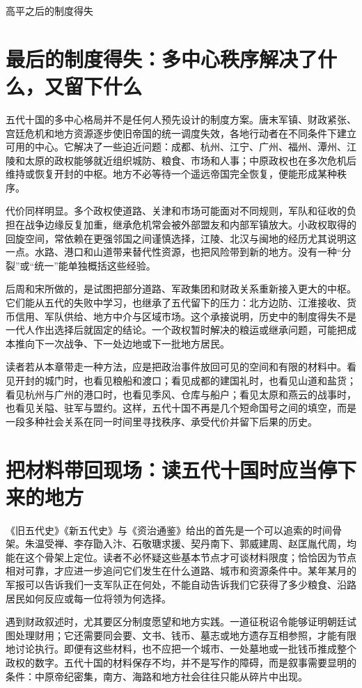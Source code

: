\begin{causalchain}{高平之后的制度得失}
\section{最后的制度得失：多中心秩序解决了什么，又留下什么}

五代十国的多中心格局并不是任何人预先设计的制度方案。唐末军镇、财政紧张、宫廷危机和地方资源逐步使旧帝国的统一调度失效，各地行动者在不同条件下建立可用的中心。它解决了一些迫近问题：成都、杭州、江宁、广州、福州、潭州、江陵和太原的政权能够就近组织城防、粮食、市场和人事；中原政权也在多次危机后维持或恢复开封的中枢。地方不必等待一个遥远帝国完全恢复，便能形成某种秩序。

代价同样明显。多个政权使道路、关津和市场可能面对不同规则，军队和征收的负担在战争边缘反复加重，继承危机常会被外部盟友和内部军镇放大。小政权取得的回旋空间，常依赖在更强邻国之间谨慎选择，江陵、北汉与闽地的经历尤其说明这一点。水路、港口和山道带来替代性资源，也把风险带到新的地方。没有一种“分裂”或“统一”能单独概括这些经验。

后周和宋所做的，是试图把部分道路、军政集团和财政关系重新接入更大的中枢。它们能从五代的失败中学习，也继承了五代留下的压力：北方边防、江淮接收、货币信用、军队供给、地方中介与区域市场。这个承接说明，历史中的制度得失不是一代人作出选择后就固定的结论。一个政权暂时解决的粮运或继承问题，可能把成本推向下一次战争、下一处边地或下一批地方居民。

读者若从本章带走一种方法，应是把政治事件放回可见的空间和有限的材料中。看见开封的城门时，也看见粮船和渡口；看见成都的建国礼时，也看见山道和盐货；看见杭州与广州的港口时，也看见季风、仓库与船户；看见太原和燕云的战事时，也看见关隘、驻军与盟约。这样，五代十国不再是几个短命国号之间的填空，而是一段多种社会关系在同一时间里寻找秩序、承受代价并留下后果的历史。

\section{把材料带回现场：读五代十国时应当停下来的地方}

《旧五代史》《新五代史》与《资治通鉴》给出的首先是一个可以追索的时间骨架。朱温受禅、李存勖入汴、石敬瑭求援、契丹南下、郭威建周、赵匡胤代周，均能在这个骨架上定位。读者不必怀疑这些基本节点才可谈材料限度；恰恰因为节点相对可靠，才应进一步追问它们发生在什么道路、城市和资源条件中。某年某月的军报可以告诉我们一支军队正在何处，不能自动告诉我们它获得了多少粮食、沿路居民如何反应或每一位将领为何选择。

遇到财政叙述时，尤其要区分制度愿望和地方实践。一道征税诏令能够证明朝廷试图处理财用；它还需要同会要、文书、钱币、墓志或地方遗存互相参照，才能有限地讨论执行。即便有这些材料，也不应把一个城市、一处墓地或一批钱币推成整个政权的数字。五代十国的材料保存不均，并不是写作的障碍，而是叙事需要显明的条件：中原帝纪密集，南方、海路和地方社会往往只能从碎片中出现。


\end{causalchain}
